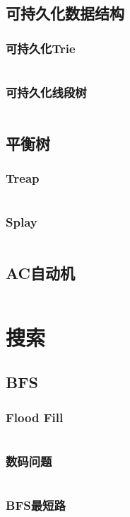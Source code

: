 \documentclass[a4paper,12pt]{article}
\begin{document}
\subsection{可持久化数据结构}
\subsubsection{可持久化Trie}
\inputminted[breaklines]{c++}{ds/last_trie.cc}
\subsubsection{可持久化线段树}
\inputminted[breaklines]{c++}{ds/last_seg.cc}
\subsection{平衡树}
\subsubsection{Treap}
\inputminted[breaklines]{c++}{ds/treap.cc}
\subsubsection{Splay}
\inputminted[breaklines]{c++}{ds/splay.cc}
\subsection{AC自动机}
\inputminted[breaklines]{c++}{ds/ac_auto.cc}


\newpage  
\section{搜索}
\subsection{BFS}
\subsubsection{Flood Fill}
\inputminted[breaklines]{c++}{search/bfs/flood.cc}
\subsubsection{数码问题}
\inputminted[breaklines]{c++}{search/bfs/shuma.cc}
\subsubsection{BFS最短路}
\inputminted[breaklines]{c++}{search/bfs/path.cc}
\end{document}
